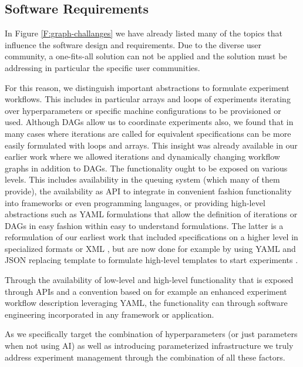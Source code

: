 \documentclass[utf8]{FrontiersinVancouver} %
\begin{document}
\subsection{Software Requirements}
\label{sec:sw-requirements}

In Figure \ref{F:graph-challanges} we have already listed many of the topics that influence the software design and requirements. Due to the diverse user community, a one-fits-all solution can not be applied and the solution must be addressing in particular the specific user communities.

For this reason, we distinguish important abstractions to formulate experiment workflows. This includes in particular arrays and loops of experiments iterating over hyperparameters or specific machine configurations to be provisioned or used. 
Although DAGs allow us to coordinate experiments also, we found that in many cases where iterations are called for equivalent specifications can be more easily formulated with loops and arrays. This insight was already available in our earlier work where we allowed iterations and dynamically changing workflow graphs \citep{las07-workflow} in addition to DAGs. The functionality ought to be exposed on various levels. This includes availability in the queuing system (which many of them provide), the availability as API to integrate in convenient fashion functionality into frameworks or even programming languages, or providing high-level abstractions such as YAML formulations that allow the definition of iterations or DAGs in easy fashion within easy to understand formulations. The latter is a reformulation of our earliest work that included specifications on a higher level in specialized formats \citep{las-96-ecwmf}  or XML \citep{las07-workflow}, but are now done for example by using YAML and JSON replacing template to formulate high-level templates to start experiments \citep{cloudmesh-cc,cloudmask-ee}.

Through the availability of low-level and high-level functionality that is exposed through APIs and a convention based on for example an enhanced experiment workflow description leveraging YAML, the functionality can through software engineering incorporated in any framework or application. 

As we specifically target the combination of hyperparameters (or just parameters when not using AI) as well as introducing parameterized infrastructure we truly address experiment management through the combination of all these factors.
\end{document}
